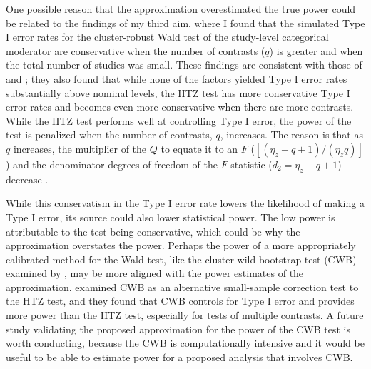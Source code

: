 One possible reason that the approximation overestimated the true power could be related to the findings of my third aim, where I found that the simulated Type I error rates for the cluster-robust Wald test of the study-level categorical moderator are conservative when the number of contrasts ($q$) is greater and when the total number of studies was small. These findings are consistent with those of \textcite{tipton2015b} and \textcite{joshi_cluster_2022}; they also found that while none of the factors yielded Type I error rates substantially above nominal levels, the HTZ test has more conservative Type I error rates and becomes even more conservative when there are more contrasts. While the HTZ test performs well at controlling Type I error, the power of the test is penalized when the number of contrasts, $q$, increases. The reason is that as $q$ increases, the multiplier of the $Q$ to equate it to an $F$ ($[(\eta_z - q +1)/(\eta_zq)]$) and the denominator degrees of freedom of the $F$-statistic ($d_2 = \eta_z - q +1$) decrease \autocite{tipton2015b}. 

While this conservatism in the Type I error rate lowers the likelihood of making a Type I error, its source could also lower statistical power. The low power is attributable to the test being conservative, which could be why the approximation overstates the power. Perhaps the power of a more appropriately calibrated method for the Wald test, like the cluster wild bootstrap test (CWB) examined by \textcite{joshi_cluster_2022}, may be more aligned with the power estimates of the approximation.  
\textcite{joshi_cluster_2022} examined CWB as an alternative small-sample correction test to the HTZ test, and they found that CWB controls for Type I error and provides more power than the HTZ test, especially for tests of multiple contrasts. A future study validating the proposed approximation for the power of the CWB test is worth conducting, because the CWB is computationally intensive and it would be useful to be able to estimate power for a proposed analysis that involves CWB. 


